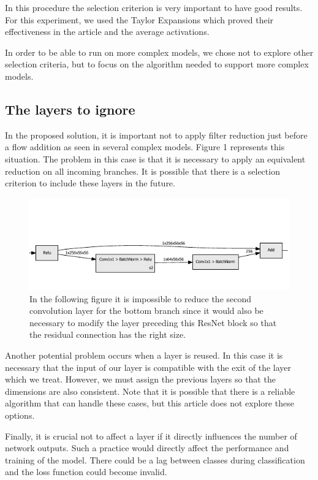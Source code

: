 \documentclass[12pt]{article}
\begin{document}
In this procedure the selection criterion is very important to have good results. For this experiment, we used the Taylor Expansions which proved their effectiveness in the article and the average activations.

In order to be able to run on more complex models, we chose not to explore other selection criteria, but to focus on the algorithm needed to support more complex models.

\subsection{The layers to ignore }
In the proposed solution, it is important not to apply filter reduction just before a flow addition as seen in several complex models. Figure 1 represents this situation. The problem in this case is that it is necessary to apply an equivalent reduction on all incoming branches. It is possible that there is a selection criterion to include these layers in the future.

\begin{figure}[H]
	\centering
	\includegraphics{residual_add}
	\caption{In the following figure it is impossible to reduce the second convolution layer for the bottom branch since it would also be necessary to modify the layer preceding this ResNet block so that the residual connection has the right size.}
	\label{fig:residualadd}
\end{figure}

Another potential problem occurs when a layer is reused. In this case it is necessary that the input of our layer is compatible with the exit of the layer which we treat. However, we must assign the previous layers so that the dimensions are also consistent.
\newpage
Note that it is possible that there is a reliable algorithm that can handle these cases, but this article does not explore these options.

Finally, it is crucial not to affect a layer if it directly influences the number of network outputs. Such a practice would directly affect the performance and training of the model. There could be a lag between classes during classification and the loss function could become invalid.
\end{document}
